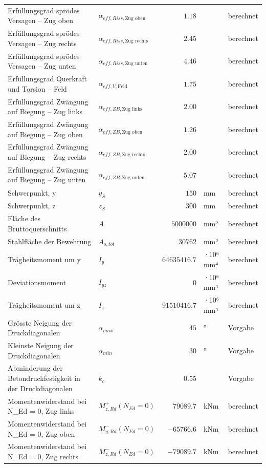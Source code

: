\documentclass[11pt,a4paper]{article}
\begin{document}
\begin{xltabular}{\linewidth}{>{\raggedright\arraybackslash}Xlrll}
Erfüllungsgrad sprödes Versagen – Zug oben & $\alpha_{eff,Riss,\text{Zug oben}}$ & $1.18$ &  & berechnet \\
Erfüllungsgrad sprödes Versagen – Zug rechts & $\alpha_{eff,Riss,\text{Zug rechts}}$ & $2.45$ &  & berechnet \\
Erfüllungsgrad sprödes Versagen – Zug unten & $\alpha_{eff,Riss,\text{Zug unten}}$ & $4.46$ &  & berechnet \\
Erfüllungsgrad Querkraft und Torsion – Feld & $\alpha_{eff,V,\text{Feld}}$ & $1.75$ &  & berechnet \\
Erfüllungsgrad Zwängung auf Biegung – Zug links & $\alpha_{eff,ZB,\text{Zug links}}$ & $2.00$ &  & berechnet \\
Erfüllungsgrad Zwängung auf Biegung – Zug oben & $\alpha_{eff,ZB,\text{Zug oben}}$ & $1.26$ &  & berechnet \\
Erfüllungsgrad Zwängung auf Biegung – Zug rechts & $\alpha_{eff,ZB,\text{Zug rechts}}$ & $2.00$ &  & berechnet \\
Erfüllungsgrad Zwängung auf Biegung – Zug unten & $\alpha_{eff,ZB,\text{Zug unten}}$ & $5.07$ &  & berechnet \\
Schwerpunkt, y & $y_S$ & $150$ & mm & berechnet \\
Schwerpunkt, z & $z_S$ & $300$ & mm & berechnet \\
Fläche des Bruttoquerschnitts & $A$ & $5000000$ & mm² & berechnet \\
Stahlfläche der Bewehrung & $A_{s,tot}$ & $30762$ & mm² & berechnet \\
Trägheitsmoment um y & $I_y$ & $64635416.7$ & ·10⁶ mm⁴ & berechnet \\
Deviationsmoment & $I_{yz}$ & $0$ & ·10⁶ mm⁴ & berechnet \\
Trägheitsmoment um z & $I_z$ & $91510416.7$ & ·10⁶ mm⁴ & berechnet \\
Grösste Neigung der Druckdiagonalen & $\alpha_{max}$ & $45$ & ° & Vorgabe \\
Kleinste Neigung der Druckdiagonalen & $\alpha_{min}$ & $30$ & ° & Vorgabe \\
Abminderung der Betondruckfestigkeit in der Druckdiagonalen & $k_c$ & $0.55$ &  & Vorgabe \\
Momentenwiderstand bei N\_Ed = 0, Zug links & $M_{z,Rd}^{+}(N_{Ed} = 0)$ & $79089.7$ & kNm & berechnet \\
Momentenwiderstand bei N\_Ed = 0, Zug oben & $M_{y,Rd}^{-}(N_{Ed} = 0)$ & $-65766.6$ & kNm & berechnet \\
Momentenwiderstand bei N\_Ed = 0, Zug rechts & $M_{z,Rd}^{-}(N_{Ed} = 0)$ & $-79089.7$ & kNm & berechnet \\

\end{xltabular}
\end{document}
